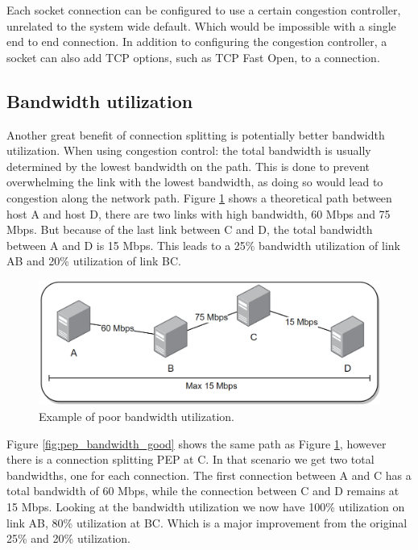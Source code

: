\documentclass[a4paper,english, 11pt]{report}
\begin{document}
Each socket connection can be configured to use a certain congestion controller, unrelated to the system wide default. Which would be impossible with a single end to end connection. In addition to configuring the congestion controller, a socket can also add TCP options, such as TCP Fast Open, to a connection.

\subsection{Bandwidth utilization}
Another great benefit of connection splitting is potentially better bandwidth utilization. When using congestion control: the total bandwidth is usually determined by the lowest bandwidth on the path\cite{top_down}. This is done to prevent overwhelming the link with the lowest bandwidth, as doing so would lead to congestion along the network path. Figure \ref{fig:pep_bandwidth_bad} shows a theoretical path between host A and host D, there are two links with high bandwidth, 60 Mbps and 75 Mbps. But because of the last link between C and D, the total bandwidth between A and D is 15 Mbps. This leads to a 25\% bandwidth utilization of link AB and 20\% utilization of link BC.\\

\begin{figure}[h!] %
	\centering
	\includegraphics[scale=0.45]{../diagrams/drawio/bandwidth_bad.png}
  	\caption{Example of poor bandwidth utilization.}
  	\label{fig:pep_bandwidth_bad}
\end{figure}

Figure \ref{fig:pep_bandwidth_good} shows the same path as Figure \ref{fig:pep_bandwidth_bad}, however there is a connection splitting PEP at C. In that scenario we get two total bandwidths, one for each connection. The first connection between A and C has a total bandwidth of 60 Mbps, while the connection between C and D remains at 15 Mbps. Looking at the bandwidth utilization we now have 100\% utilization on link AB, 80\% utilization at BC. Which is a major improvement from the original 25\% and 20\% utilization.
\end{document}
